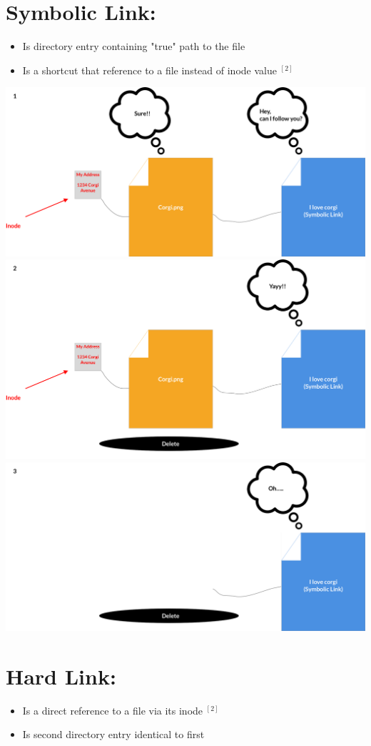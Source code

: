 \documentclass[12pt]{article}
\begin{document}
\section{Symbolic Link:}
\begin{itemize}
    \item Is directory entry containing "true" path to the file
    \item Is a shortcut that reference to a file instead of inode value $^{[2]}$
\end{itemize}

\begin{center}
    \includegraphics[width=0.8\linewidth]{../images/midterm_4_solution_19.png}
    \includegraphics[width=0.8\linewidth]{../images/midterm_4_solution_20.png}
    \includegraphics[width=0.8\linewidth]{../images/midterm_4_solution_21.png}
\end{center}

\section{Hard Link:}
\begin{itemize}
    \item Is a direct reference to a file via its inode $^{[2]}$
    \item Is second directory entry identical to first
\end{itemize}
\end{document}
